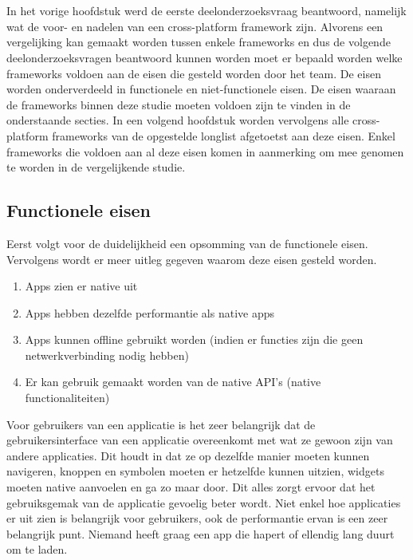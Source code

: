 \chapter{}
\label{ch:eisen-framework}

In het vorige hoofdstuk werd de eerste deelonderzoeksvraag beantwoord, namelijk wat de voor- en nadelen van een cross-platform framework zijn. Alvorens een vergelijking kan gemaakt worden tussen enkele frameworks en dus de volgende deelonderzoeksvragen beantwoord kunnen worden moet er bepaald worden welke frameworks voldoen aan de eisen die gesteld worden door het team. De eisen worden onderverdeeld in functionele en niet-functionele eisen. De eisen waaraan de frameworks binnen deze studie moeten voldoen zijn te vinden in de onderstaande secties. In een volgend hoofdstuk worden vervolgens alle cross-platform frameworks van de opgestelde longlist afgetoetst aan deze eisen. Enkel frameworks die voldoen aan al deze eisen komen in aanmerking om mee genomen te worden in de vergelijkende studie.

\section{Functionele eisen}
\label{sec:functioneleEisen}

Eerst volgt voor de duidelijkheid een opsomming van de functionele eisen. Vervolgens wordt er meer uitleg gegeven waarom deze eisen gesteld worden.

\begin{enumerate}
    \item Apps zien er native uit
    \item Apps hebben dezelfde performantie als native apps
    \item Apps kunnen offline gebruikt worden (indien er functies zijn die geen netwerkverbinding nodig hebben)
    \item Er kan gebruik gemaakt worden van de native API's (native functionaliteiten)
\end{enumerate}

Voor gebruikers van een applicatie is het zeer belangrijk dat de gebruikersinterface van een applicatie overeenkomt met wat ze gewoon zijn van andere applicaties. Dit houdt in dat ze op dezelfde manier moeten kunnen navigeren, knoppen en symbolen moeten er hetzelfde kunnen uitzien, widgets moeten native aanvoelen en ga zo maar door. Dit alles zorgt ervoor dat het gebruiksgemak van de applicatie gevoelig beter wordt. Niet enkel hoe applicaties er uit zien is belangrijk voor gebruikers, ook de performantie ervan is een zeer belangrijk punt. Niemand heeft graag een app die hapert of ellendig lang duurt om te laden. 

